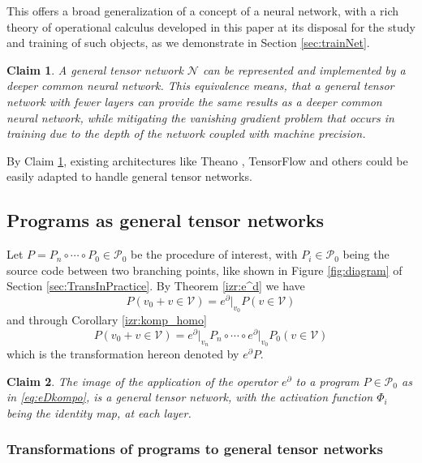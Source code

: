\documentclass[preprint,12pt]{elsarticle}
\newcommand{\VV}{\mathcal{V}}
\newcommand{\NN}{\mathcal{N}}
\newcommand{\dP}{\mathcal{P}}
\newcommand{\D}{\partial}
\newtheorem{trditev}{Claim}[section]
\begin{document}
This offers a broad generalization of a concept of a neural network, with a rich theory of operational calculus developed in this paper at its disposal for the study and training of such objects, as we demonstrate in Section \ref{sec:trainNet}.

\begin{trditev}\label{trd:netEquivalence}
A general tensor network $\NN$ can be represented and implemented by a deeper common neural network. This equivalence means, that a general tensor network with fewer layers can provide the same results as a deeper common neural network, while mitigating the vanishing gradient problem \cite{VanishingGradient} that occurs in training due to the depth of the network coupled with machine precision.
\end{trditev}

By Claim \ref{trd:netEquivalence}, existing architectures like Theano \cite{Theano}, TensorFlow \cite{TensorFlow} and others could be easily adapted to handle general tensor networks.

\subsection{Programs as general tensor networks}\label{sec:progAsNet}

Let $P=P_n\circ\cdots\circ P_0\in\dP_0$ be the procedure of interest, with $P_i\in\dP_0$ being the source code between two branching points, like shown in Figure \ref{fig:diagram} of Section \ref{sec:TransInPractice}.
By Theorem \ref{izr:e^d} we have
\begin{equation}
P(v_0+v\in \VV)=e^\D\vert_{v_0} P(v\in \VV)
\end{equation}
and through Corollary \ref{izr:komp_homo}
\begin{equation}\label{eq:eDkompo}
P(v_0+v\in \VV)=e^\D\vert_{v_n} P_n\circ\cdots \circ e^\D\vert_{v_0} P_0(v\in \VV)
\end{equation}
which is the transformation hereon denoted by $e^\D P$.

\begin{trditev}
The image of the application of the operator $e^\D$ to a program $P\in\dP_0$ as in \eqref{eq:eDkompo}, is a general tensor network, with the activation function $\Phi_i$ being the identity map, at each layer.
\end{trditev}

\subsubsection{Transformations of programs to general tensor networks}\label{sec:transToNet}
\end{document}
